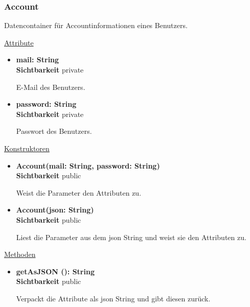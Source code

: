 \subsubsection{Account} \label{app:klasse:Account}
Datencontainer für Accountinformationen eines Benutzers. \newline

\underline{Attribute}
\begin{itemize}
\itemsep0pt
\item \textbf{mail: String} \hfill\\ 
\textbf{Sichtbarkeit} private

E-Mail des Benutzers.

\item \textbf{password: String} \hfill\\ 
\textbf{Sichtbarkeit} private

Passwort des Benutzers.
\end{itemize}

\underline{Konstruktoren}
\begin{itemize}
\itemsep0pt
\item \textbf{Account(mail: String, password: String)} \hfill\\
\textbf{Sichtbarkeit} public

Weist die Parameter den Attributen zu.

\item \textbf{Account(json: String)} \hfill\\
\textbf{Sichtbarkeit} public

Liest die Parameter aus dem json String und weist sie den Attributen zu.
\end{itemize}

\underline{Methoden}
\begin{itemize}
\itemsep0pt

\item \textbf{getAsJSON (): String}\hfill\\
\textbf{Sichtbarkeit} public

Verpackt die Attribute als json String und gibt diesen zurück.

\end{itemize}